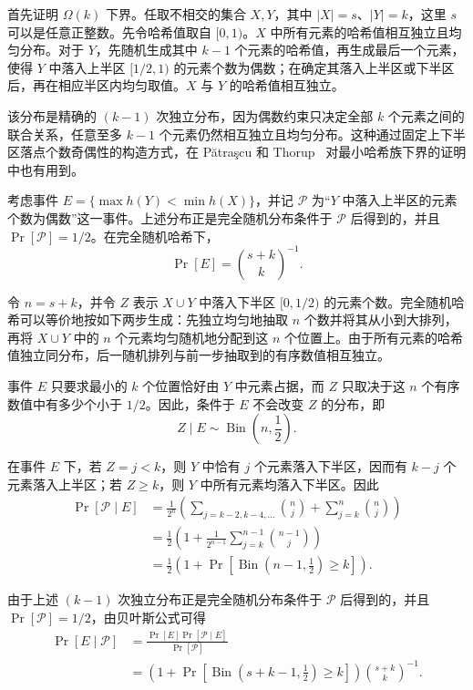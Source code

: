 首先证明 $\Omega(k)$ 下界。任取不相交的集合 $X,Y$，其中 $|X|=s$、$|Y|=k$，这里 $s$ 可以是任意正整数。先令哈希值取自 $[0,1)$。$X$ 中所有元素的哈希值相互独立且均匀分布。对于 $Y$，先随机生成其中 $k-1$ 个元素的哈希值，再生成最后一个元素，使得 $Y$ 中落入上半区 $[1/2,1)$ 的元素个数为偶数；在确定其落入上半区或下半区后，再在相应半区内均匀取值。$X$ 与 $Y$ 的哈希值相互独立。

该分布是精确的 $(k-1)$ 次独立分布，因为偶数约束只决定全部 $k$ 个元素之间的联合关系，任意至多 $k-1$ 个元素仍然相互独立且均匀分布。这种通过固定上下半区落点个数奇偶性的构造方式，在 Pătraşcu 和 Thorup~\cite{PT_lb_t_wise_min_wise} 对最小哈希族下界的证明中也有用到。

考虑事件 $E=\{\max h(Y)<\min h(X)\}$，并记 $\mathcal P$ 为“$Y$ 中落入上半区的元素个数为偶数”这一事件。上述分布正是完全随机分布条件于 $\mathcal P$ 后得到的，并且 $\Pr[\mathcal P]=1/2$。在完全随机哈希下，
$$
    \Pr[E]=\binom{s+k}{k}^{-1}.
$$

令 $n=s+k$，并令 $Z$ 表示 $X\cup Y$ 中落入下半区 $[0,1/2)$ 的元素个数。完全随机哈希可以等价地按如下两步生成：先独立均匀地抽取 $n$ 个数并将其从小到大排列，再将 $X\cup Y$ 中的 $n$ 个元素均匀随机地分配到这 $n$ 个位置上。由于所有元素的哈希值独立同分布，后一随机排列与前一步抽取到的有序数值相互独立。

事件 $E$ 只要求最小的 $k$ 个位置恰好由 $Y$ 中元素占据，而 $Z$ 只取决于这 $n$ 个有序数值中有多少个小于 $1/2$。因此，条件于 $E$ 不会改变 $Z$ 的分布，即
$$
    Z\mid E\sim\operatorname{Bin}\left(n,\frac12\right).
$$

在事件 $E$ 下，若 $Z=j<k$，则 $Y$ 中恰有 $j$ 个元素落入下半区，因而有 $k-j$ 个元素落入上半区；若 $Z\ge k$，则 $Y$ 中所有元素均落入下半区。因此
\begin{align*}
    \Pr[\mathcal P\mid E]
    &=
    \frac{1}{2^n}
    \left(
        \sum_{j = k - 2, k - 4, \ldots}
        \binom{n}{j}
        +
        \sum_{j=k}^{n}\binom{n}{j}
    \right)\\
    &=
    \frac12\left(
        1+
        \frac{1}{2^{n-1}}
        \sum_{j=k}^{n-1}\binom{n-1}{j}
    \right)\\
    &=
    \frac12\left(
        1+
        \Pr\left[
            \operatorname{Bin}\left(n-1,\frac12\right)\ge k
        \right]
    \right).
\end{align*}

由于上述 $(k-1)$ 次独立分布正是完全随机分布条件于 $\mathcal P$ 后得到的，并且 $\Pr[\mathcal P]=1/2$，由贝叶斯公式可得
\begin{align*}
    \Pr[E\mid\mathcal P]
    &=
    \frac{\Pr[E]\Pr[\mathcal P\mid E]}
         {\Pr[\mathcal P]}\\
    &=
    \left(
        1+
        \Pr\left[
            \operatorname{Bin}\left(s+k-1,\frac12\right)\ge k
        \right]
    \right)
    \binom{s+k}{k}^{-1}.
\end{align*}

